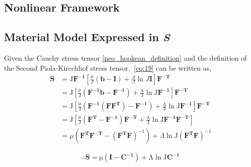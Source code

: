 \documentclass[../main.tex]{subfiles}
\begin{document}
    \begin{appendices} 
    \section{Nonlinear Framework}
    \subsection{Material Model Expressed in \emph{\textbf{S}}}
    Given the Cauchy stress tensor \eqref{neo_hookean_definition} and the definition of the Second Piola-Kircchhof stress tensor,~\eqref{eq:19}
     can be written as,
    \begin{equation}
        \begin{split}
        \mathrm{\boldsymbol{S}} &= \mathrm{J \boldsymbol{F^{-1}}} \left[ \frac{\mu}{J} \left(\boldsymbol{b} - \boldsymbol{I}\right) + \frac{\Lambda}{J}\ln{J}\boldsymbol{I}\right] \boldsymbol{F^{-T}}\\
        &= \mathrm{J}  \mathrm{\left[ \frac{\mu}{J} \left(\boldsymbol{F^{-1}b} - \boldsymbol{F^{-1}}\right) + \frac{\Lambda}{J}\ln{J}\boldsymbol{F^{-1}}\right] \boldsymbol{F^{-T}}}\\
        &= \mathrm{J} \mathrm{\left[ \frac{\mu}{J} \left(\boldsymbol{F^{-1}}\left(\boldsymbol{FF^T}\right) - \boldsymbol{F^{-1}}\right) + \frac{\Lambda}{J}\ln{J}\boldsymbol{F^{-1}}\right]} \boldsymbol{F^{-T}}\\ 
        &= \mathrm{J} \mathrm{\left[ \frac{\mu}{J} \left(\boldsymbol{F^T} - \boldsymbol{F^{-1}} \right) \boldsymbol{F^{-T}} + \frac{\Lambda}{J} \ln{J}\boldsymbol{F^{-1}F^{-T}} \right]}\\ 
        &= \mu \left( \mathrm{\boldsymbol{F^TF^{-T}}} - \left( \mathrm{\boldsymbol{F^TF}} \right)^{-1} \right) + \Lambda\mathrm{\ln{J}\left(\boldsymbol{F^TF}\right)^{-1}}
        \end{split}
    \end{equation}
    
    \begin{equation}\label{S_neohookean}
        \therefore \mathrm{\boldsymbol{S} = \mu\left(\boldsymbol{I} - \boldsymbol{C^{-1}}\right) + \Lambda\ln{J}\boldsymbol{C^{-1}}}
    \end{equation}

\end{appendices}
\end{document}

